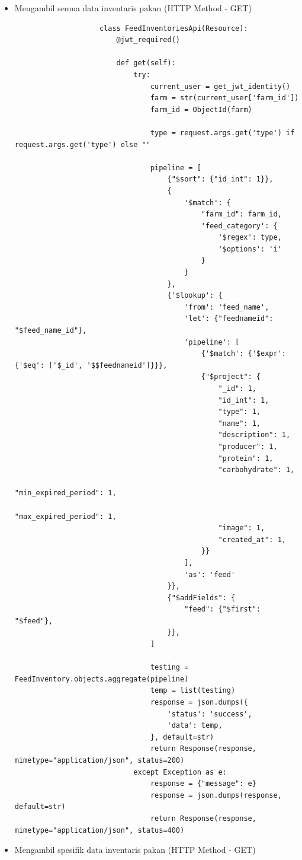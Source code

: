 \begin{spacing}{1.5}
\begin{enumerate}
\begin{enumerate}
			\begin{itemize}
				\item Mengambil semua data inventaris pakan (HTTP Method - GET)
				
				\begin{lstlisting}
					class FeedInventoriesApi(Resource):
						@jwt_required()

						def get(self):
							try:
								current_user = get_jwt_identity()
								farm = str(current_user['farm_id'])
								farm_id = ObjectId(farm)
					
								type = request.args.get('type') if request.args.get('type') else ""
					
								pipeline = [
									{"$sort": {"id_int": 1}},
									{
										'$match': {
											"farm_id": farm_id,
											'feed_category': {
												'$regex': type,
												'$options': 'i'
											}
										}
									},
									{'$lookup': {
										'from': 'feed_name',
										'let': {"feednameid": "$feed_name_id"},
										'pipeline': [
											{'$match': {'$expr': {'$eq': ['$_id', '$$feednameid']}}},
											{"$project": {
												"_id": 1,
												"id_int": 1,
												"type": 1,
												"name": 1,
												"description": 1,
												"producer": 1,
												"protein": 1,
												"carbohydrate": 1,
												"min_expired_period": 1,
												"max_expired_period": 1,
												"image": 1,
												"created_at": 1,
											}}
										],
										'as': 'feed'
									}},
									{"$addFields": {
										"feed": {"$first": "$feed"},
									}},
								]
							
								testing = FeedInventory.objects.aggregate(pipeline)
								temp = list(testing)
								response = json.dumps({
									'status': 'success',
									'data': temp,
								}, default=str)
								return Response(response, mimetype="application/json", status=200)
							except Exception as e:
								response = {"message": e}
								response = json.dumps(response, default=str)
								return Response(response, mimetype="application/json", status=400)
				\end{lstlisting}

				\item Mengambil spesifik data inventaris pakan (HTTP Method - GET)
				

\end{itemize}
\end{enumerate}
\end{enumerate}
\end{spacing}
